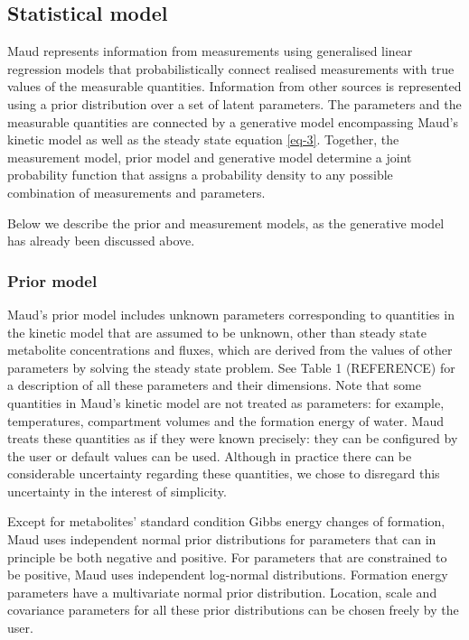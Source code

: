 \documentclass[
  letterpaper,
  DIV=11,
  numbers=noendperiod]{scrartcl}
\begin{document}
\hypertarget{statistical-model}{%
\subsection{Statistical model}\label{statistical-model}}

Maud represents information from measurements using generalised linear
regression models that probabilistically connect realised measurements
with true values of the measurable quantities. Information from other
sources is represented using a prior distribution over a set of latent
parameters. The parameters and the measurable quantities are connected
by a generative model encompassing Maud's kinetic model as well as the
steady state equation \eqref{eq-3}. Together, the measurement model,
prior model and generative model determine a joint probability function
that assigns a probability density to any possible combination of
measurements and parameters.

Below we describe the prior and measurement models, as the generative
model has already been discussed above.

\hypertarget{prior-model}{%
\subsubsection{Prior model}\label{prior-model}}

Maud's prior model includes unknown parameters corresponding to
quantities in the kinetic model that are assumed to be unknown, other
than steady state metabolite concentrations and fluxes, which are
derived from the values of other parameters by solving the steady state
problem. See Table 1 (REFERENCE) for a description of all these
parameters and their dimensions. Note that some quantities in Maud's
kinetic model are not treated as parameters: for example, temperatures,
compartment volumes and the formation energy of water. Maud treats these
quantities as if they were known precisely: they can be configured by
the user or default values can be used. Although in practice there can
be considerable uncertainty regarding these quantities, we chose to
disregard this uncertainty in the interest of simplicity.

Except for metabolites' standard condition Gibbs energy changes of
formation, Maud uses independent normal prior distributions for
parameters that can in principle be both negative and positive. For
parameters that are constrained to be positive, Maud uses independent
log-normal distributions. Formation energy parameters have a
multivariate normal prior distribution. Location, scale and covariance
parameters for all these prior distributions can be chosen freely by the
user.
\end{document}
